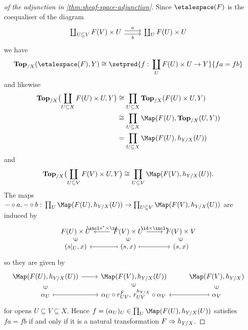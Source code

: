 \documentclass[../main.tex]{subfiles}
\begin{document}
\begin{proof}[of the adjunction in \cref{thm:sheaf-space-adjunction}]
Since $\etalespace(F)$ is the coequaliser of the diagram
\begin{equation*}
    \begin{tikzcd}
        \coprod_{U\subseteq V} F(V)\times U \ar[r, "a", shift left] \ar[r, "b"', shift right] & \coprod_{U} F(U)\times U
    \end{tikzcd}
\end{equation*}
we have
\[ \cont[X](\etalespace(F),Y) \cong \setpred{f\colon\coprod_U F(U)\times U\to Y}{fa=fb} \]
and likewise
\begin{align*}
    \cont[X]\bigl(\coprod_{U\subseteq X} F(U)\times U,Y\bigr) & \cong \prod_{U\subseteq X} \cont[X](F(U)\times U,Y) \\
    & \cong \prod_{U\subseteq X} \Map(F(U),\cont[X](U,Y)) \\
    & = \prod_{U\subseteq X} \Map(F(U),h_{Y/X}(U))
\end{align*}
and
\[ \cont[X]\bigl(\coprod_{U\subseteq V} F(V)\times U,Y\bigr) \cong \prod_{U\subseteq V}\Map(F(V),h_{Y/X}(U))\text{.} \]
The maps $-\circ a,-\circ b\colon\prod_U\Map(F(U),h_{Y/X}(U))\to\prod_{U\subseteq V}\Map(F(V),h_{Y/X}(U))$ are induced by
\begin{equation*}
    \begin{tikzcd}[row sep=tiny]
        F(U)\times U & F(V)\times U \ar[l, "\incl*^*\times\id"'] \ar[r, "\id\times \incl*"] & F(V)\times V \\
        (s|_U, x) \ar[u, "\in", phantom, marking] & (s,x) \ar[l, mapsto] \ar[r, mapsto] \ar[u, "\in", phantom, marking] & (s,x) \ar[u, "\in", phantom, marking]
    \end{tikzcd}
\end{equation*}
so they are given by
\begin{equation*}
    \begin{tikzcd}[row sep=tiny]
        \Map(F(U),h_{Y/X}(U)) \ar[r] & \Map(F(V),h_{Y/X}(U)) & \Map(F(V),h_{Y/X}) \\
        \alpha_U \ar[u, "\in", phantom, marking] \ar[r, mapsto] & \alpha_U\circ r^F_{UV}\text{,}\ r^{h_{Y/X}}_{UV}\circ\alpha_V \ar[u, "\in", phantom, marking] & \alpha_V \ar[u, "\in", phantom, marking] \ar[l, mapsto]
    \end{tikzcd}
\end{equation*}
for opens $U\subseteq V\subseteq X$.
Hence $f = (\alpha_U)_U \in \prod_U \Map(F(U),h_{Y/X}(U))$ satisfies $fa=fb$ if and only if it is a natural transformation $F\Rightarrow h_{Y/X}$.
\end{proof}
\end{document}
